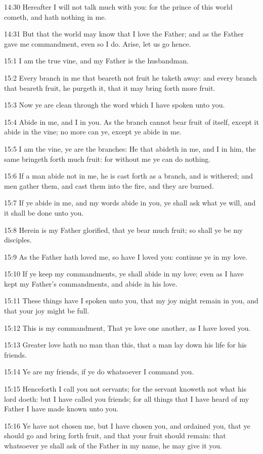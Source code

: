 14:30 Hereafter I will not talk much with you: for the prince of this
world cometh, and hath nothing in me.

14:31 But that the world may know that I love the Father; and as the
Father gave me commandment, even so I do. Arise, let us go hence.

15:1 I am the true vine, and my Father is the husbandman.

15:2 Every branch in me that beareth not fruit he taketh away: and
every branch that beareth fruit, he purgeth it, that it may bring
forth more fruit.

15:3 Now ye are clean through the word which I have spoken unto you.

15:4 Abide in me, and I in you. As the branch cannot bear fruit of
itself, except it abide in the vine; no more can ye, except ye abide
in me.

15:5 I am the vine, ye are the branches: He that abideth in me, and I
in him, the same bringeth forth much fruit: for without me ye can do
nothing.

15:6 If a man abide not in me, he is cast forth as a branch, and is
withered; and men gather them, and cast them into the fire, and they
are burned.

15:7 If ye abide in me, and my words abide in you, ye shall ask what
ye will, and it shall be done unto you.

15:8 Herein is my Father glorified, that ye bear much fruit; so shall
ye be my disciples.

15:9 As the Father hath loved me, so have I loved you: continue ye in
my love.

15:10 If ye keep my commandments, ye shall abide in my love; even as I
have kept my Father's commandments, and abide in his love.

15:11 These things have I spoken unto you, that my joy might remain in
you, and that your joy might be full.

15:12 This is my commandment, That ye love one another, as I have
loved you.

15:13 Greater love hath no man than this, that a man lay down his life
for his friends.

15:14 Ye are my friends, if ye do whatsoever I command you.

15:15 Henceforth I call you not servants; for the servant knoweth not
what his lord doeth: but I have called you friends; for all things
that I have heard of my Father I have made known unto you.

15:16 Ye have not chosen me, but I have chosen you, and ordained you,
that ye should go and bring forth fruit, and that your fruit should
remain: that whatsoever ye shall ask of the Father in my name, he may
give it you.


